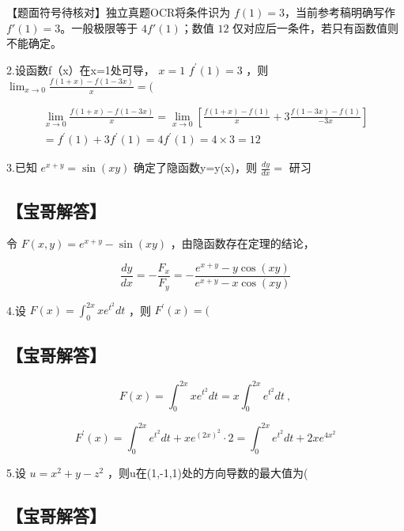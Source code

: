 \documentclass[11pt,fontset=fandol]{ctexart}
\begin{document}
【题面符号待核对】独立真题OCR将条件识为 \(f(1)=3\)，当前参考稿明确写作
\(f'(1)=3\)。一般极限等于 \(4f'(1)\)；数值 \(12\)
仅对应后一条件，若只有函数值则不能确定。

2.设函数f（x）在x=1处可导， \(x = 1\) \(f ^ { \prime } ( 1 ) = 3\) ，则
\(\lim _ { x \to 0 } { \frac { f ( 1 + x ) - f ( 1 - 3 x ) } { x } } = (\)

\[
\begin{array} { l } { \displaystyle \lim _ { x \to 0 } \frac { f ( 1 + x ) - f ( 1 - 3 x ) } { x } = \lim _ { x \to 0 } \left[ \frac { f ( 1 + x ) - f ( 1 ) } { x } + 3 \frac { f ( 1 - 3 x ) - f ( 1 ) } { - 3 x } \right] } \\ { = f ^ { \prime } ( 1 ) + 3 f ^ { \prime } ( 1 ) = 4 f ^ { \prime } ( 1 ) = 4 \times 3 = 1 2 } \end{array}
\]

3.已知 \(e ^ { x + y } = \sin ( x y )\) 确定了隐函数y=y(x)，则
\(\frac { d y } { d x } =\) 研习

\subsection{【宝哥解答】}\label{ux5b9dux54e5ux89e3ux7b54}

令 \(F ( x , y ) = e ^ { x + y } - \sin ( x y )\)
，由隐函数存在定理的结论，

\[
\frac { d y } { d x } = - \frac { F _ { x } } { F _ { y } } = - \frac { e ^ { x + y } - y \cos ( x y ) } { e ^ { x + y } - x \cos ( x y ) }
\]

4.设 \(F ( x ) = \int _ { 0 } ^ { 2 x } x e ^ { t ^ { 2 } } d t\) ，则
\(F ^ { \prime } ( x ) = (\)

\subsection{【宝哥解答】}\label{ux5b9dux54e5ux89e3ux7b54-1}

\[
F ( x ) = \int _ { 0 } ^ { 2 x } x e ^ { t ^ { 2 } } d t = x \int _ { 0 } ^ { 2 x } e ^ { t ^ { 2 } } d t \ ,
\]

\[
F ^ { \prime } ( x ) = \int _ { 0 } ^ { 2 x } e ^ { t ^ { 2 } } d t + x e ^ { ( 2 x ) ^ { 2 } } \cdot 2 = \int _ { 0 } ^ { 2 x } e ^ { t ^ { 2 } } d t + 2 x e ^ { 4 x ^ { 2 } }
\]

5.设 \(u = x ^ { 2 } + y - z ^ { 2 }\)
，则u在(1,-1,1)处的方向导数的最大值为(

\subsection{【宝哥解答】}\label{ux5b9dux54e5ux89e3ux7b54-2}
\end{document}
